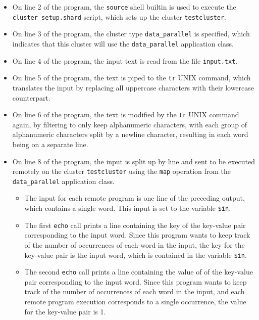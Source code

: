 \documentclass[twoside]{report}
\begin{document}
\begin{itemize}
  \item
        \begin{sloppypar}
          On line 2 of the program, the \texttt{source} shell builtin is used to execute the \texttt{cluster\_setup.shard} script, which sets up the cluster \texttt{testcluster}.
        \end{sloppypar}
  \item On line 3 of the program, the cluster type \texttt{data\_parallel} is specified, which indicates that this cluster will use the \texttt{data\_parallel} application class.
  \item
        On line 4 of the program, the input text is read from the file \texttt{input.txt}.
  \item
        On line 5 of the program, the text is piped to the \texttt{tr} UNIX command, which translates the input by replacing all uppercase characters with their lowercase counterpart.
  \item
        On line 6 of the program, the text is modified by the \texttt{tr} UNIX command again, by filtering to only keep alphanumeric characters, with each group of alphanumeric characters split by a newline character, resulting in each word being on a separate line.
  \item
        On line 8 of the program, the input is split up by line and sent to be executed remotely on the cluster \texttt{testcluster} using the \texttt{map} operation from the \texttt{data\_parallel} application class.
        \begin{itemize}
          \item The input for each remote program is one line of the preceding output, which contains a single word. This input is set to the variable \texttt{\$in}.
          \item The first \texttt{echo} call prints a line containing the key of the key-value pair corresponding to the input word.
                Since this program wants to keep track of the number of occurrences of each word in the input, the key for the key-value pair is the input word, which is contained in the variable \texttt{\$in}.
          \item The second \texttt{echo} call prints a line containing the value of of the key-value pair corresponding to the input word.
                Since this program wants to keep track of the number of occurrences of each word in the input, and each remote program execution corresponds to a single occurrence, the value for the key-value pair is 1.
        \end{itemize}


\end{itemize}
\end{document}
